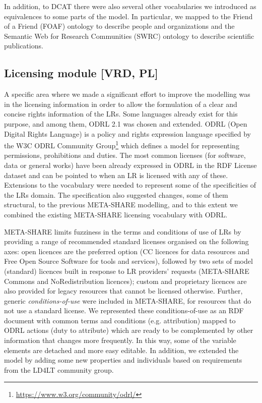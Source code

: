 \documentclass{llncs}
\begin{document}
{In addition, to DCAT there were also several other vocabularies we introduced
as equivalences to some parts of the model. In particular, we mapped to the Friend of
a Friend (FOAF) ontology to describe people and organizations and the Semantic
Web for Research Communities (SWRC) ontology to describe scientific
publications.

\subsection{Licensing module [VRD, PL]}
\label{sec:licensing}

A specific area where we made a significant effort to improve the modelling was
in the licensing information in order to allow the formulation of a clear and
concise rights information of the LRs. 
Some languages already exist for this purpose, and among them, ODRL 2.1 was
chosen and extended. ODRL (Open Digital Rights Language) is a policy and rights
expression language specified by the W3C ODRL Community
Group\footnote{\url{https://www.w3.org/community/odrl/}} which defines a model
for representing permissions, prohibitions and duties.
The most common licenses (for software, data or general works) have been already expressed in ODRL in the RDF License dataset\cite{rdflicense} and can be pointed to when an LR is licensed with any of these.
Extensions to the vocabulary were needed to represent some of the specificities
of the LRs domain. The specification also suggested changes, some of them
structural, to the previous META-SHARE modelling, and to this extent we
combined the existing META-SHARE licensing vocabulary with ODRL.


META-SHARE limits fuzziness in the terms and conditions of use of LRs by
providing a range
of recommended standard licenses organised on the following axes: open licences are the preferred option
(CC licences for data resources and Free Open Source Software for tools and
services), followed by two sets of model (standard) licences built in response
to LR providers' requests (META-SHARE Commons and NoRedistribution licences);
custom and proprietary licences are also provided for legacy
resources that cannot be licensed otherwise. 
Further, generic \textit{conditions-of-use} were included in META-SHARE, for
resources that do not use a standard license. We represented these
conditions-of-use as an RDF
document with common terms and conditions (e.g. attribution) mapped to ODRL
actions (duty to attribute) which are ready to be complemented by other
information that changes more frequently. In this way, some of the variable
elements are detached and more easy editable. 
In addition, we extended the model by adding some new properties and individuals
based on requirements from the LD4LT community group.


}
\end{document}
